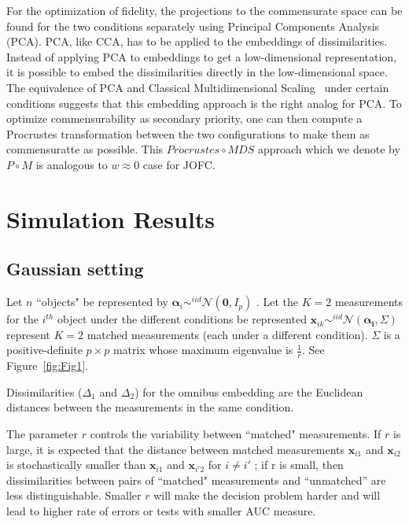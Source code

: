 \documentclass[12pt]{article} %
\begin{document}
 For the optimization of fidelity, the projections to the commensurate space can be found for the two conditions separately  using Principal Components Analysis (PCA).  PCA, like CCA, has to be applied to the embeddings of dissimilarities. Instead of applying PCA to embeddings to get a low-dimensional representation, it is possible to   embed the dissimilarities directly in the low-dimensional space. The equivalence of PCA and Classical Multidimensional Scaling~\cite{CMDS} under certain conditions suggests that this embedding approach is the right analog for PCA. To optimize commensurability as secondary priority, one can then  compute a Procrustes transformation between the two configurations to make them as commensuratte as possible.
  This $Procrustes \circ MDS$  approach  which we denote by  $P\circ M$ is  analogous to $w\approx 0$ case for JOFC. 




\section{Simulation Results\label{sec:Simulation Results}}
\subsection{Gaussian setting\label{subsec:GaussianSet}}

  Let $n$ ``objects" be represented  by  $\bm{\alpha}_i \sim^{iid} \mathcal{N}(\bm{0},I_p)$ .  Let the $K=2$ measurements for the $i^{th}$ object under the different conditions be represented  $\bm{x}_{ik}  \sim^{iid} \mathcal{N}(\bm{\alpha_i},\Sigma)$ represent $K=2$ matched measurements (each under a different condition).
  $\Sigma$ is a positive-definite $p\times p$ matrix whose maximum eigenvalue is   $\frac{1}{r} $. See Figure~\ref{fig:Fig1}.
  
 Dissimilarities ($\Delta_1$ and  $\Delta_2$) for the omnibus embedding are the Euclidean distances between the measurements in the same condition.
 
The parameter $r$ controls the variability between ``matched" measurements. If $r$ is large, it is expected that the distance between matched measurements
$\bm{x}_{i1}$ and $\bm{x}_{i2}$ is stochastically smaller than $\bm{x}_{i1}$ and $\bm{x}_{i'2}$ for $i \neq i'$ ; if r is small, then dissimilarities  between pairs of ``matched"  measurements and 
``unmatched'' are less distinguishable. Smaller $r$ will make the decision problem harder and will lead to higher rate of errors or tests with smaller AUC measure.
\end{document}
